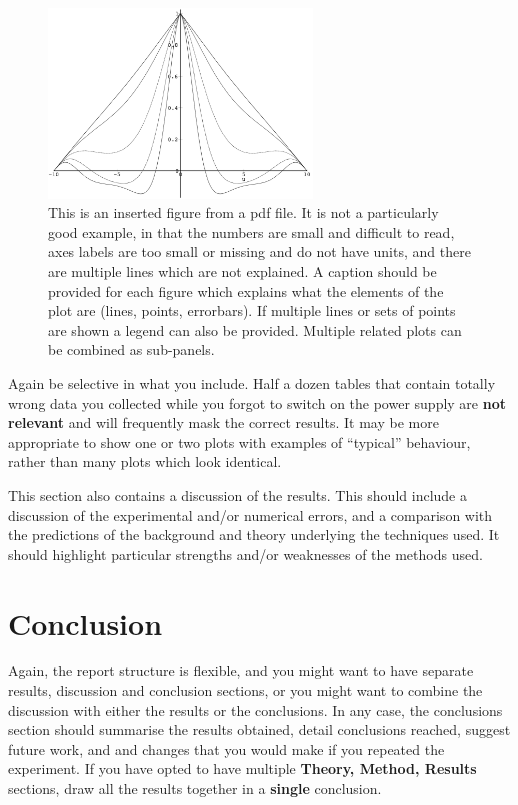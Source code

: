\documentclass[a4paper,12pt]{article}
\begin{document}
%
%
\begin{figure}[htb]     %
        \begin{center}
        \includegraphics[width=7cm]{example_plot.pdf}
        	\end{center}
	\caption{This is an inserted figure from a pdf file. It is not a particularly good example, in that the numbers are small and difficult to read, axes labels are too small or missing and do not have units, and there are multiple lines which are not explained. A caption should be provided for each figure which explains what the elements of the plot are (lines, points, errorbars). If multiple lines or sets of points are shown a legend can also be provided. Multiple related plots can be combined as sub-panels.}
\end{figure}

Again be selective in what you include. Half a dozen
tables that contain totally wrong data you collected while you forgot
to switch on the power supply are {\bf not relevant} and will frequently
mask the correct results. It may be more appropriate to show one or two 
plots with examples of ``typical'' behaviour, rather than many plots which 
look identical.

This section also contains a discussion of the results. This should
include a discussion of the experimental and/or numerical errors, and a
comparison with the predictions of the background and theory underlying
the techniques used. It should highlight particular strengths
and/or weaknesses of the methods used.

 
\section{Conclusion}

Again, the report structure is flexible, and you might want to have separate
results, discussion and conclusion sections, or you might want to combine
the discussion with either the results or the conclusions. In any case, the 
conclusions section should summarise the results obtained, detail
conclusions reached, suggest future work, and and changes that you would make 
if you repeated the experiment. 
If you have opted to have multiple {\bf Theory, Method, Results}
sections, draw all the results together in a {\bf single} conclusion.
\end{document}
